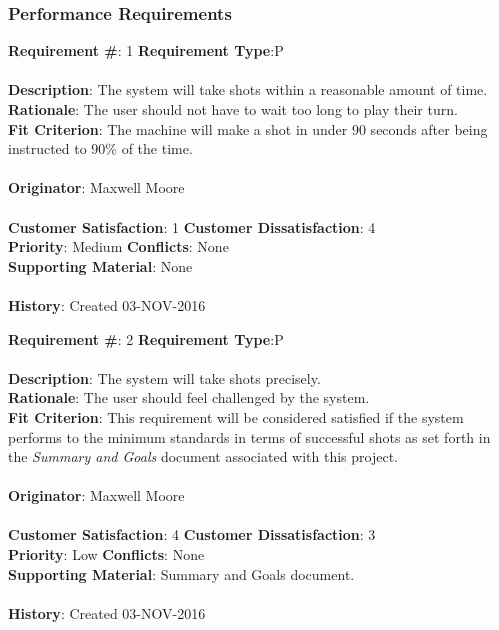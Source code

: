 \documentclass[titlepage]{article}
\begin{document}
\subsubsection{Performance Requirements}
\begin{framed}
	\noindent\textbf{Requirement \#}: 1 \hfill \textbf{Requirement Type}:P\hfill\\\\
	\noindent\textbf{Description}: The system will take shots within a reasonable amount of time.\\
	\textbf{Rationale}: The user should not have to wait too long to play their turn.\\
	\textbf{Fit Criterion}: The machine will make a shot in under 90 seconds after being instructed to 90\% of the time.\\\\
	\textbf{Originator}: Maxwell Moore\\\\
	\noindent\textbf{Customer Satisfaction}: 1 \hfill 	\textbf{Customer Dissatisfaction}: 4 \hfill\\
	\textbf{Priority}: Medium \hfill \textbf{Conflicts}: None \hfill\\
	\textbf{Supporting Material}: None\\\\
	\noindent\textbf{History}: Created 03-NOV-2016
\end{framed}

\begin{framed}
	\noindent\textbf{Requirement \#}: 2 \hfill \textbf{Requirement Type}:P\hfill\\\\
	\noindent\textbf{Description}: The system will take shots precisely.\\
	\textbf{Rationale}: The user should feel challenged by the system.\\
	\textbf{Fit Criterion}: This requirement will be considered satisfied if the system performs to the minimum standards in terms of successful shots as set forth in the \textit{Summary and Goals} document associated with this project.\\\\
	\textbf{Originator}: Maxwell Moore\\\\
	\noindent\textbf{Customer Satisfaction}: 4 \hfill 	\textbf{Customer Dissatisfaction}: 3\hfill\\
	\textbf{Priority}: Low \hfill \textbf{Conflicts}: None \hfill\\
	\textbf{Supporting Material}: Summary and Goals document.\\\\
	\noindent\textbf{History}: Created 03-NOV-2016
\end{framed}
\end{document}
